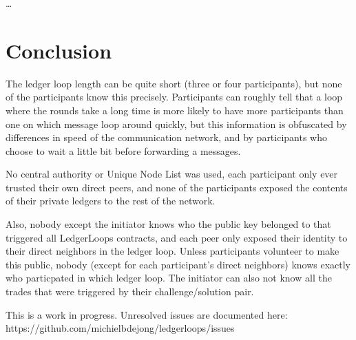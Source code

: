 \documentclass[11pt,twoside,a4paper]{article}
\begin{document}
\ldots

\section{Conclusion}
The ledger loop length can be quite short (three or four participants), but none of the participants know this precisely. Participants can roughly tell that a loop where the rounds take a long time is more likely to have more participants than one on which message loop around quickly,
but this information is obfuscated by differences in speed of the communication network, and by participants who choose to wait a
little bit before forwarding a messages.

No central authority or Unique Node List was used, each participant only ever trusted their own direct peers, and none of the participants
exposed the contents of their private ledgers to the rest of the network.

Also, nobody except the initiator knows who the public key belonged to that triggered all LedgerLoops contracts, and each peer only exposed
their identity to their direct neighbors in the ledger loop. Unless participants volunteer to make this public,
nobody (except for each participant's direct neighbors) knows exactly who particpated in which ledger loop.
The initiator can also not know all the trades that were triggered by their challenge/solution pair.

This is a work in progress. Unresolved issues are documented here:
https://github.com/michielbdejong/ledgerloops/issues
\end{document}
